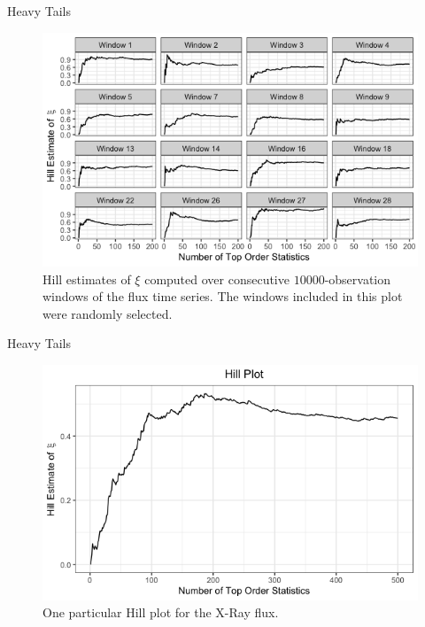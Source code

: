 \documentclass{beamer}
\begin{document}
\begin{frame}{Heavy Tails}
    \begin{figure}[h!]
        \centering
        \includegraphics[scale=0.4]{hill_ests.png}
        \caption{Hill estimates of $\xi$ computed over consecutive $\num[group-separator={,}]{10000}$-observation windows of the flux time series. The windows included in this plot were randomly selected.}
        \label{fig:hill_ests}
    \end{figure}
\end{frame}

\begin{frame}{Heavy Tails}
    \begin{figure}
        \centering
        \includegraphics[scale=0.5]{hill_plot.png}
        \caption{One particular Hill plot for the X-Ray flux.}
        \label{fig:hill_plot}
    \end{figure}
\end{frame}
\end{document}
